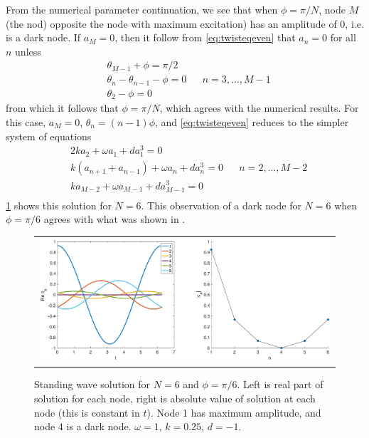 \documentclass[12pt]{article}
\begin{document}
From the numerical parameter continuation, we see that when $\phi = \pi/N$, node $M$ (the nod) opposite the node with maximum excitation) has an amplitude of 0, i.e. is a dark node. If $a_M = 0$, then it follow from \cref{eq:twisteqeven} that $a_n = 0$ for all $n$ unless
\begin{equation}\label{eq:evendarknodecond}
\begin{aligned}
&\theta_{M-1} + \phi = \pi/2 \\
&\theta_{n} - \theta_{n-1} - \phi = 0 && n = 3, \dots, M-1 \\
&\theta_2 - \phi = 0
\end{aligned}
\end{equation}
from which it follows that $\phi = \pi/N$, which agrees with the numerical results. For this case, $a_M = 0$, $\theta_n = (n-1)\phi$, and \cref{eq:twisteqeven} reduces to the simpler system of equations
\begin{equation}\label{eq:twisteqevenhole}
\begin{aligned}
&2 k a_2 + \omega a_1 + d a_1^3 = 0 \\
&k\left( a_{n+1} + a_{n-1} \right) + \omega a_n + d a_n^3 = 0 && n = 2, \dots, M-2 \\
&k a_{M-2} + \omega a_{M-1} + d a_{M-1}^3 = 0 \\
\end{aligned}
\end{equation}
\cref{fig:evenhole6} shows this solution for $N=6$. This observation of a dark node for $N = 6$ when $\phi = \pi/6$ agrees with what was shown in \cite{castro2016}.

\begin{figure}[H]
\begin{center}
\begin{tabular}{c}
\includegraphics[width=15cm]{images/evenhole6.eps}
\end{tabular}
\end{center}
\caption{Standing wave solution for $N = 6$ and $\phi = \pi/6$. Left is real part of solution for each node, right is absolute value of solution at each node (this is constant in $t$). Node 1 has maximum amplitude, and node 4 is a dark node. $\omega = 1$, $k = 0.25$, $d=-1$.}
\label{fig:evenhole6}
\end{figure}
\end{document}
